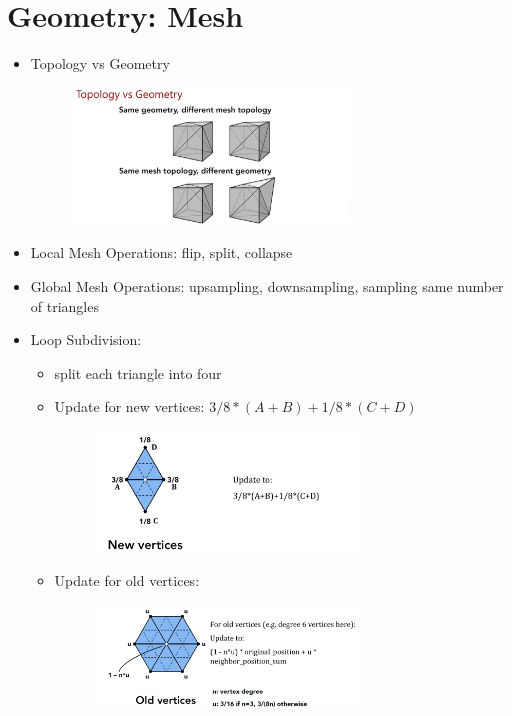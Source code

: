 \documentclass{article}
\begin{document}
\section{Geometry: Mesh}


\begin{itemize}
    \item Topology vs Geometry
    \begin{figure}[H]
        \centering
        \includegraphics[width=0.7\textwidth]{imgs/mesh_vs_topo.jpeg}
    \end{figure}
    
    \item Local Mesh Operations: flip, split, collapse
    \item Global Mesh Operations: upsampling, downsampling,  sampling same number of triangles
    
    \item Loop Subdivision: 
    \begin{itemize}
        \item split each triangle into four
        \item Update for new vertices: $3/8*(A+B)+1/8*(C+D)$
        \begin{figure}[H]
        \centering
        \includegraphics[width=0.7\textwidth]{imgs/update_new.jpeg}
    \end{figure}
        \item Update for old vertices: 
        \begin{figure}[H]
        \centering
        \includegraphics[width=0.7\textwidth]{imgs/update_old.jpeg}
    \end{figure}
    

\end{itemize}
\end{itemize}
\end{document}
